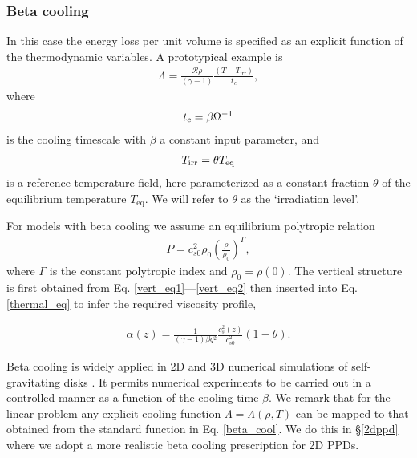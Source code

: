 \subsubsection{Beta cooling}
In this case the energy loss per unit volume is specified 
as an explicit function of the thermodynamic variables. 
A prototypical example is 
\begin{align}\label{beta_cool}
  \Lambda =
  \frac{\mathcal{R}\rho}{(\gamma-1)}\frac{\left(T-T_\mathrm{irr}\right)}{t_c}, 
\end{align}
where 
\begin{align}
  t_\mathrm{c} = \beta\Omega^{-1} 
\end{align}
is the cooling timescale with $\beta$ a constant input parameter, and
\begin{align}
  T_\mathrm{irr} = \theta T_\mathrm{eq}
\end{align}
is a reference temperature field, here parameterized as a constant fraction
$\theta$ of the equilibrium temperature $T_\mathrm{eq}$. We will refer
to $\theta$ as the `irradiation level'.  

For models with beta cooling we assume an equilibrium polytropic relation
\begin{align} 
  P  =
c_{s0}^2\rho_0\left(\frac{\rho}{\rho_0}\right)^\Gamma,
\end{align}
where $\Gamma$ is the constant polytropic index and $\rho_0 =
\rho(0)$. The vertical
structure is first obtained from Eq. \ref{vert_eq1}---\ref{vert_eq2}
then inserted into Eq. \ref{thermal_eq} to infer the required
viscosity profile,  

\begin{align}\label{alpha_beta_relation}
\alpha(z) = \frac{1}{(\gamma-1)\beta
   q^2}\frac{c_s^2(z)}{c_{s0}^2}\left(1 - \theta\right). 
\end{align}


 Beta cooling is widely applied in 2D and 3D
numerical simulations of self-gravitating disks \citep{gammie01,
  rice05,baehr15}. It permits numerical experiments to be carried out in a
controlled manner as a function of the cooling time $\beta$. 
We remark that for the linear problem  
any explicit cooling function $\Lambda=\Lambda(\rho,T)$ can be
mapped to that obtained from the standard function in Eq.
\ref{beta_cool}. We do this in \S\ref{2dppd} where we adopt a more
realistic beta cooling prescription for 2D PPDs.  

